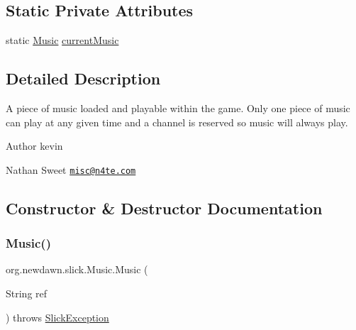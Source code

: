 \subsection*{Static Private Attributes}
\begin{DoxyCompactItemize}
\item 
static \mbox{\hyperlink{classorg_1_1newdawn_1_1slick_1_1_music}{Music}} \mbox{\hyperlink{classorg_1_1newdawn_1_1slick_1_1_music_a74d1b5592170c007631f4d3b7789dbbf}{current\+Music}}
\end{DoxyCompactItemize}


\subsection{Detailed Description}
A piece of music loaded and playable within the game. Only one piece of music can play at any given time and a channel is reserved so music will always play.

\begin{DoxyAuthor}{Author}
kevin 

Nathan Sweet \href{mailto:misc@n4te.com}{\tt misc@n4te.\+com} 
\end{DoxyAuthor}


\subsection{Constructor \& Destructor Documentation}
\mbox{\label{classorg_1_1newdawn_1_1slick_1_1_music_a6a8d9426a6c0070efcd19ba03d218a89}} 
\subsubsection{\texorpdfstring{Music()}{Music()}\hspace{0.1cm}{\footnotesize\ttfamily [1/5]}}
{\footnotesize\ttfamily org.\+newdawn.\+slick.\+Music.\+Music (\begin{DoxyParamCaption}\item[{String}]{ref }\end{DoxyParamCaption}) throws \mbox{\hyperlink{classorg_1_1newdawn_1_1slick_1_1_slick_exception}{Slick\+Exception}}\hspace{0.3cm}{\ttfamily [inline]}}

